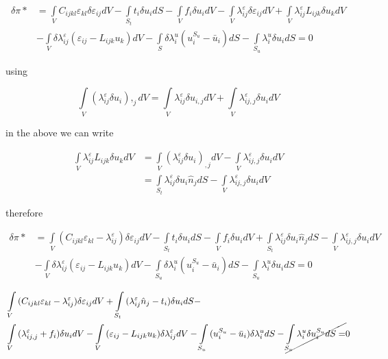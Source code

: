 \begin{equation}
\begin{aligned}
\delta \pi * &= \int\limits_V {{C_{ijkl}}{\varepsilon _{kl}}\delta {\varepsilon _{ij}}dV - \int\limits_{{S_t}} {{t_i}\delta {u_i}dS}  - \int\limits_V {{f_i}\delta {u_i}dV - } }\int\limits_V {\lambda _{ij}^\varepsilon \delta {\varepsilon _{ij}}dV}  + \int\limits_V {\lambda _{ij}^\varepsilon {L_{ijk}}\delta {u_k}dV}\\
&- \int\limits_V {\delta \lambda _{ij}^\varepsilon ({\varepsilon _{ij}} - {L_{ijk}}{u_k})dV - \int\limits_S {\delta \lambda _i^u(u_i^{{S_u}} - {{\bar u}_i})dS - \int\limits_{{S_u}} {\lambda _i^u\delta {u_i}dS = 0} } }
\end{aligned}
\end{equation}

using

\[\int\limits_V {(\lambda _{ij}^\varepsilon \delta {u_i}){,_j}dV = } \int\limits_V {\lambda _{ij}^\varepsilon \delta {u_{i,j}}dV}  + \int\limits_V {\lambda _{ij,j}^\varepsilon \delta {u_i}dV} \]

in the above we can write

\begin{align*}
\int\limits_V {\lambda _{ij}^\varepsilon {L_{ijk}}\delta {u_k}dV} & = \int\limits_V {{{(\lambda _{ij}^\varepsilon \delta {u_i})}_{,j}}dV}  - \int\limits_V {\lambda _{ij,j}^\varepsilon \delta {u_i}dV}\\
& = \int\limits_{{S_t}} {\lambda _{ij}^\varepsilon \delta {u_i}{{\hat n}_j}dS}  - \int\limits_V {\lambda _{ij,j}^\varepsilon \delta {u_i}dV}
\end{align*}

therefore


\begin{align*}
\delta \pi * &= \int\limits_V {({C_{ijkl}}{\varepsilon _{kl}} - \lambda _{ij}^\varepsilon )\delta {\varepsilon _{ij}}dV - \int\limits_{{S_t}} {{t_i}\delta {u_i}dS}  - \int\limits_V {{f_i}\delta {u_i}dV + } } \int\limits_{{S_t}} {\lambda _{ij}^\varepsilon \delta {u_i}{{\hat n}_j}dS}  - \int\limits_V {\lambda _{ij,j}^\varepsilon \delta {u_i}dV}\\
&- \int\limits_V {\delta \lambda _{ij}^\varepsilon ({\varepsilon _{ij}} - {L_{ijk}}{u_k})dV}  - \int\limits_{{S_u}} {\delta \lambda _i^u(u_i^{{S_u}} - {{\bar u}_i})dS}  - \int\limits_{{S_u}} {\lambda _i^u\delta {u_i}dS}  = 0
\end{align*}


\begin{align*}
&\int\limits_V {({C_{ijkl}}{\varepsilon _{kl}} - \lambda _{ij}^\varepsilon )\delta {\varepsilon _{ij}}dV
+ \int\limits_{{S_t}} {(\lambda _{ij}^\varepsilon {{\hat n}_j} - {t_i})\delta {u_i}dS}  - }\\
&\int\limits_V {(\lambda _{ij,j}^\varepsilon  + {f_i})\delta {u_i}dV}
- \int\limits_V {({\varepsilon _{ij}} - {L_{ijk}}{u_k})\delta \lambda _{ij}^\varepsilon dV}
- \int\limits_{{S_u}} {(u_i^{{S_u}} - {{\bar u}_i})\delta \lambda _i^udS}  - \cancel{\int\limits_{{S_u}} {\lambda _i^u\delta u_i^{{S_u}}dS} = } 0
\end{align*}


